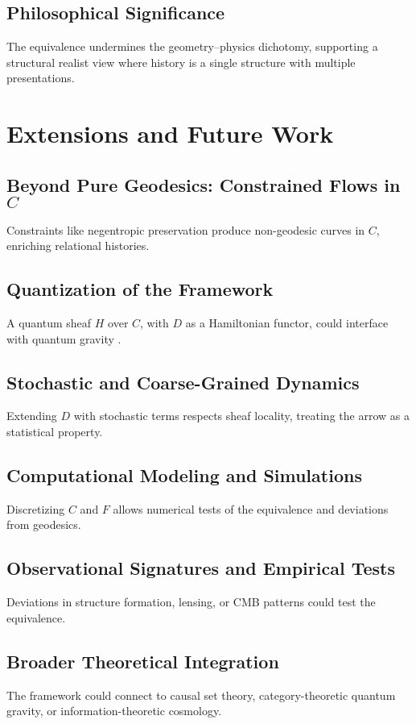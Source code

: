 \documentclass[11pt]{article}
\begin{document}
\subsection{Philosophical Significance}
The equivalence undermines the geometry–physics dichotomy, supporting a structural realist view where history is a single structure with multiple presentations.

\section{Extensions and Future Work}

\subsection{Beyond Pure Geodesics: Constrained Flows in $C$}
Constraints like negentropic preservation produce non-geodesic curves in $C$, enriching relational histories.

\subsection{Quantization of the Framework}
A quantum sheaf $H$ over $C$, with $D$ as a Hamiltonian functor, could interface with quantum gravity \citep{Rovelli2004}.

\subsection{Stochastic and Coarse-Grained Dynamics}
Extending $D$ with stochastic terms respects sheaf locality, treating the arrow as a statistical property.

\subsection{Computational Modeling and Simulations}
Discretizing $C$ and $F$ allows numerical tests of the equivalence and deviations from geodesics.

\subsection{Observational Signatures and Empirical Tests}
Deviations in structure formation, lensing, or CMB patterns could test the equivalence.

\subsection{Broader Theoretical Integration}
The framework could connect to causal set theory, category-theoretic quantum gravity, or information-theoretic cosmology.
\end{document}
